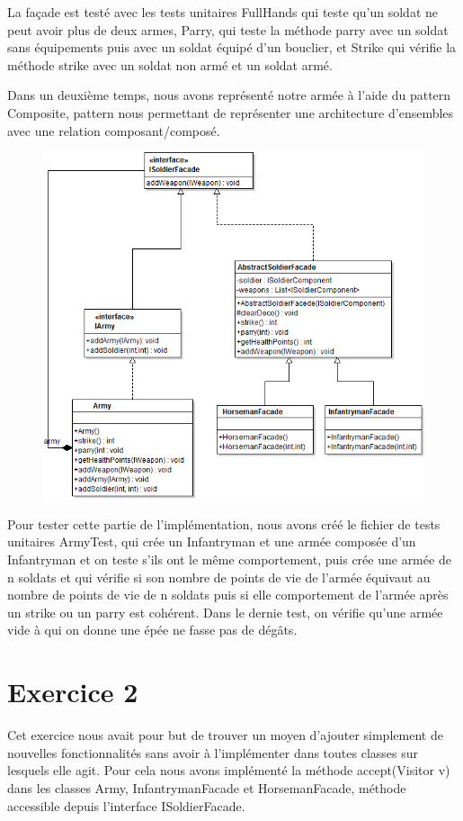\documentclass[%
a4paper,
11pt
]{article}
\begin{document}
La façade est testé avec les tests unitaires FullHands qui teste qu'un soldat ne peut avoir plus de deux armes, Parry, qui teste la méthode parry avec un soldat sans équipements puis avec un soldat équipé d'un bouclier, et Strike qui vérifie la méthode strike avec un soldat non armé et un soldat armé.


Dans un deuxième temps, nous avons représenté notre armée à l'aide du pattern Composite, pattern nous permettant de représenter une architecture d'ensembles avec une relation composant/composé.

\begin{figure}[!ht]
    \center
    \includegraphics[width =13cm]{imgs/Composite.png}
\end{figure}

Pour tester cette partie de l'implémentation, nous avons créé le fichier de tests unitaires ArmyTest, qui crée un Infantryman et une armée composée d'un Infantryman et on teste s'ils ont le même comportement, puis crée une armée de n soldats et qui vérifie si son nombre de points de vie de l'armée équivaut au nombre de points de vie de n soldats puis si elle comportement de l'armée après un strike ou un parry est cohérent. Dans le dernie test, on vérifie qu'une armée vide à qui on donne une épée ne fasse pas de dégâts.

\section*{Exercice 2}
Cet exercice nous avait pour but de trouver un moyen d'ajouter simplement de nouvelles fonctionnalités sans avoir à l'implémenter dans toutes classes sur lesquels elle agit.
Pour cela nous avons implémenté la méthode accept(Visitor v) dans les classes Army, InfantrymanFacade et HorsemanFacade, méthode accessible depuis l'interface ISoldierFacade.
\newpage
\end{document}
